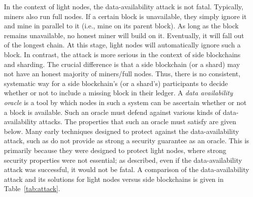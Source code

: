 \documentclass{article}
\begin{document}
In the context of light nodes, the data-availability attack is not fatal. Typically, miners also run full nodes. If a certain block is unavailable, they simply ignore it and mine in parallel to it (i.e., mine on its parent block). As long as the block remains unavailable, no honest miner will build on it. Eventually, it will fall out of the longest chain. At this stage, light nodes will automatically ignore such a block. In contrast, the attack is more serious in the context of side blockchains and sharding. The crucial difference is that a side blockchain (or a shard) may not have an honest majority of miners/full nodes. Thus, there is no consistent, systematic way for a side blockchain's (or a shard's) participants to decide whether or not to include a missing block in their ledger. A \textit{data availability oracle} is a tool by which nodes in such a system can be ascertain whether or not a block is available. Such an oracle must defend against various kinds of data-availability attacks. The properties that such an oracle must satisfy are given below. Many early techniques designed to protect against the data-availability attack, such as \cite{yu2020coded, al2018fraud} do not provide as strong a security guarantee as an oracle. This is primarily because they were designed to protect light nodes, where strong security properties were not essential; as described, even if the data-availability attack was successful, it would not be fatal. A comparison of the data-availability attack and its solutions for light nodes versus side blockchains is given in Table~\ref{tab:attack}.
\end{document}
